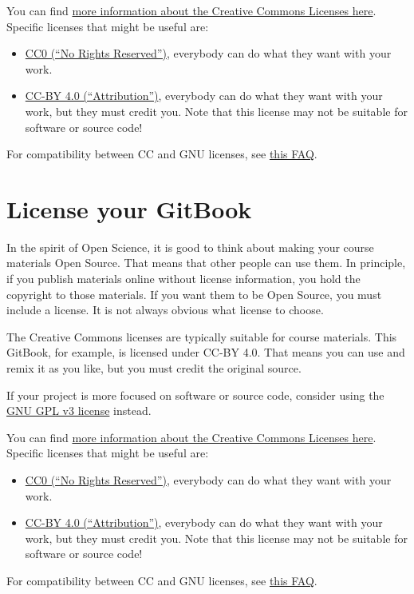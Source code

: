 \documentclass[
]{book}
\providecommand{\tightlist}{%
  \setlength{\itemsep}{0pt}\setlength{\parskip}{0pt}}
\begin{document}
You can find \href{https://creativecommons.org/share-your-work/licensing-examples}{more information about the Creative Commons Licenses here}. Specific licenses that might be useful are:

\begin{itemize}
\tightlist
\item
  \href{https://creativecommons.org/share-your-work/public-domain/cc0/}{CC0 (``No Rights Reserved'')}, everybody can do what they want with your work.
\item
  \href{https://creativecommons.org/licenses/by/4.0/}{CC-BY 4.0 (``Attribution'')}, everybody can do what they want with your work, but they must credit you. Note that this license may not be suitable for software or source code!
\end{itemize}

For compatibility between CC and GNU licenses, see \href{https://creativecommons.org/faq/\#Can_I_apply_a_Creative_Commons_license_to_software.3F}{this FAQ}.

\hypertarget{license-your-gitbook-1}{%
\chapter{License your GitBook}\label{license-your-gitbook-1}}

In the spirit of Open Science, it is good to think about making your course materials Open Source. That means that other people can use them. In principle, if you publish materials online without license information, you hold the copyright to those materials. If you want them to be Open Source, you must include a license. It is not always obvious what license to choose.

The Creative Commons licenses are typically suitable for course materials. This GitBook, for example, is licensed under CC-BY 4.0. That means you can use and remix it as you like, but you must credit the original source.

If your project is more focused on software or source code, consider using the \href{https://www.gnu.org/licenses/gpl-3.0.en.html}{GNU GPL v3 license} instead.

You can find \href{https://creativecommons.org/share-your-work/licensing-examples}{more information about the Creative Commons Licenses here}. Specific licenses that might be useful are:

\begin{itemize}
\tightlist
\item
  \href{https://creativecommons.org/share-your-work/public-domain/cc0/}{CC0 (``No Rights Reserved'')}, everybody can do what they want with your work.
\item
  \href{https://creativecommons.org/licenses/by/4.0/}{CC-BY 4.0 (``Attribution'')}, everybody can do what they want with your work, but they must credit you. Note that this license may not be suitable for software or source code!
\end{itemize}

For compatibility between CC and GNU licenses, see \href{https://creativecommons.org/faq/\#Can_I_apply_a_Creative_Commons_license_to_software.3F}{this FAQ}.

  
\end{document}

